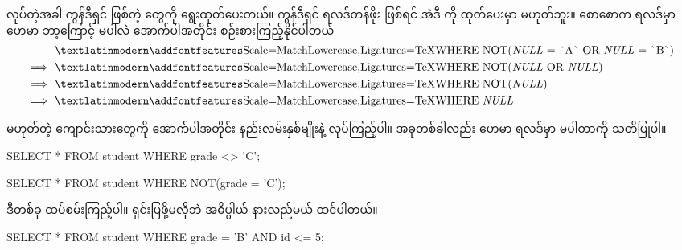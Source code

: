  လုပ်တဲ့အခါ  ကွန်ဒီရှင်  ဖြစ်တဲ့  တွေကို ရွေးထုတ်ပေးတယ်။  ကွန်ဒီရှင် ရလဒ်တန်ဖိုး  ဖြစ်ရင် အဲဒီ  ကို ထုတ်ပေးမှာ မဟုတ်ဘူး။ စောစောက  ရလဒ်မှာ ဟေမာ ဘာ့ကြောင့်  မပါလဲ အောက်ပါအတိုင်း စဉ်းစားကြည့်နိုင်ပါတယ်%
%
\begin{align*}
         &\text{\fEn{WHERE NOT(\textit{NULL} = \`{}A\`{} OR \textit{NULL} = \`{}B\`{})}}\\
\implies &\text{\fEn{WHERE NOT(\textit{NULL} OR \textit{NULL})}}\\
\implies &\text{\fEn{WHERE NOT(\textit{NULL})}}\\
\implies &\text{\fEn{WHERE \textit{NULL}}}\\
\end{align*}%

 မဟုတ်တဲ့ ကျောင်းသားတွေကို အောက်ပါအတိုင်း နည်းလမ်းနှစ်မျိုးနဲ့  လုပ်ကြည့်ပါ။ အခုတစ်ခါလည်း ဟေမာ ရလဒ်မှာ မပါတာကို သတိပြုပါ။
%
\begin{sql}
SELECT * FROM student WHERE grade <> 'C';
\end{sql}
%
%
\begin{sql}
SELECT * FROM student WHERE NOT(grade = 'C');
\end{sql}
%
ဒီတစ်ခု ထပ်စမ်းကြည့်ပါ။ ရှင်းပြဖို့မလိုဘဲ အဓိပ္ပါယ် နားလည်မယ် ထင်ပါတယ်။
%
\begin{sql}
SELECT * FROM student WHERE grade = 'B' AND id <= 5;
\end{sql}
%

